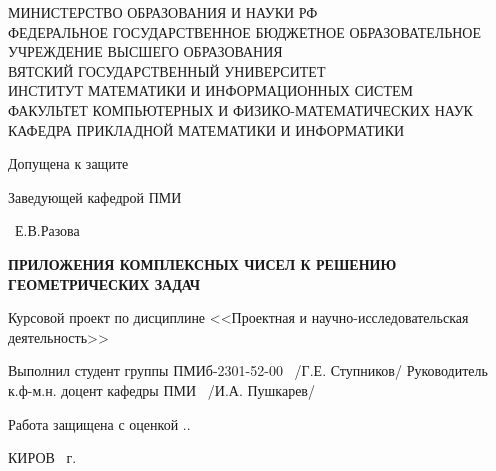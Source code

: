 \begin{titlepage}
    \begin{center}
        \begin{small}
            \begin{singlespace}
                \MakeUppercase{
                    МИНИСТЕРСТВО ОБРАЗОВАНИЯ И НАУКИ РФ\\ \vspace{0.7em}
                    Федеральное государственное бюджетное образовательное учреждение  высшего образования\\
                    ВЯТСКИЙ ГОСУДАРСТВЕННЫЙ УНИВЕРСИТЕТ\\ \vspace{0.7em}
                    Институт математики и информационных систем \\ \vspace{0.7em}
                    Факультет компьютерных и физико-математических наук\\ \vspace{0.7em}
                    Кафедра прикладной математики и информатики
                }
            \end{singlespace}
        \end{small}
        \vfill
        {\raggedleft
            Допущена к защите

            Заведующей кафедрой ПМИ

            \uline{\hspace{9em}}~Е.В.Разова

        }
        \vspace{5em}

        \MakeUppercase{
            \large{
                {\bfseries Приложения комплексных чисел к решению геометрических задач}
            }}
        \vspace{2em}

        Курсовой проект по дисциплине <<Проектная и научно-исследовательская деятельность>>
    \end{center}
    \vfill
    Выполнил студент группы ПМИб-2301-52-00 { \uline{\hspace{9em}}~/Г.Е. Ступников/}
    Руководитель к.ф-м.н. доцент кафедры ПМИ { \uline{\hspace{8.5em}}~/И.А. Пушкарев/
    }
    \vspace{2em}

    {\raggedright
        Работа защищена с оценкой \uline{\hspace{6em}} \hfill \uline{\hspace{2.5em}}.\uline{\hspace{2.5em}}.\the\year\
    }
    \vfill

    \begin{center}
        \MakeUppercase{Киров} \the\year\ г.
    \end{center}
\end{titlepage}
\setcounter{page}{2}
